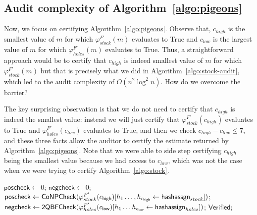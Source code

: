 \subsection{Audit complexity of Algorithm~\ref{algo:pigeons}}

Now, we focus on certifying Algorithm~\ref{algo:pigeons}. Observe that, $c_{high}$ is the smallest value of $m$ for which $\varphi_{stock}^{F'}(m)$  evaluates to True and $c_{low}$ is the largest value of $m$ for which $\varphi_{holes}^{F'}(m)$ evaluates to True. Thus, a straightforward approach would be to certify that  $c_{high}$ is indeed smallest value of $m$ for which $\varphi_{stock}^{F'}(m)$ but that is precisely what we did in Algorithm~\ref{algo:stock-audit}, which led to the audit complexity of $O(n^2 \log ^2 n)$. How do we overcome the barrier? 

The key surprising observation is that we do not need to certify that  $c_{high}$ is indeed the smallest value: instead we will just certify that  $\varphi_{stock}^{F'}(c_{high})$ evaluates to True and $\varphi_{holes}^{F'}(c_{low})$ evaluates to True, and then we check $c_{high} - c_{low} \leq 7$, and these three facts allow the auditor to certify the estimate returned by Algorithm~\ref{algo:pigeons}. Note that we were able to side step certifying $c_{high}$ being the smallest value because we had access to $c_{low}$, which was not the case when we were trying to certify Algorithm~\ref{algo:stock}.











\begin{algorithm}
	\caption{CountAuditor$(F',\toolname(F))$}
	  \label{algo:lonely-audit}
	\begin{algorithmic}[1]
\State $\mathsf{poscheck}\gets 0$; $\mathsf{negcheck}\gets 0$;
\State  $\mathsf{poscheck}\gets \mathsf{CoNPCheck} (\varphi_{stock}^{F'}(c_\mathsf{high})[h_1\ldots,h_{c_\mathsf{high}} \gets \mathsf{hashassgn}_{stock}])$; \label{line:zconpcheck}
                \State  $\mathsf{negcheck}\gets \mathsf{2QBFCheck}(\varphi_{holes}^{F'}(c_\mathsf{low})[h_1\ldots h_{c_\mathsf{low}}\gets \mathsf{hashassign}_{holes}])$;\label{line:ztwoqbfcheck}   \label{line:zconncheck}
		\label{line:zequalcheck}                            
               \Return $\mathsf{Verified}$;
\EndIf
\end{algorithmic}
      
\end{algorithm}



